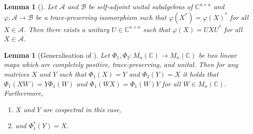 \documentclass[a4paper,onecolumn,11pt,accepted=2026-01-06]{quantumarticle}
\theoremstyle{plain}
\newtheorem{lem}[thm]{Lemma}
\theoremstyle{remark}
\theoremstyle{definition}
\newcommand{\complex}{\mathbb{C}}
\def\calA{{\mathcal A}} \def\calB{{\mathcal B}} \def\calC{{\mathcal C}}
\begin{document}
\begin{lem}[{\cite[Lemma A.1]{david_mathprog}}]
  \label{lem:linalg_unitary}
  Let $\calA$ and $\calB$ be self-adjoint unital subalgebras of $\complex^{n\times n}$ and $\varphi\colon \calA \to \calB$ be a trace-preserving isomorphism such that $\varphi(X^*) = \varphi(X)^*$ for all $X\in\calA$.
  Then there exists a unitary $U \in \complex^{n\times n}$ such that $\varphi(X) = UXU^*$ for all $X\in\calA$.
\end{lem}


\begin{lem}[Generalisation of {\cite[Lemma 4.9]{david_mathprog}}]
  \label{lem:lingalg_series}
  Let $\Phi_1, \Phi_2\colon M_n(\mathbb{C}) \to M_n(\mathbb{C})$ be two linear maps which are completely positive, trace-preserving, and unital.
  Then for any matrices $X$ and $Y$ such that $\Phi_1(X) = Y$ and $\Phi_2(Y) = X$ it holds that $\Phi_1(XW) = Y\Phi_1(W)$ and $\Phi_1(WX) = \Phi_1(W)Y$ for all $W \in M_n(\mathbb{C})$. Furthermore, 
  
  \begin{enumerate}[label = \roman*.]
      \item $X$ and $Y$ are cospectral in this case,
      \item and $\Phi_1^*(Y) = X$. 
  \end{enumerate}
\end{lem}
\end{document}
